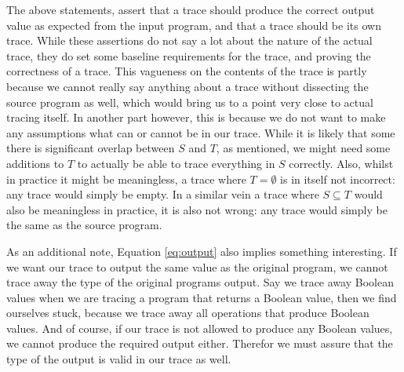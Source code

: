         The above statements, assert that a trace should produce the correct output value as expected from the input program, and that a trace should be its own trace.
        While these assertions do not say a lot about the nature of the actual trace, they do set some baseline requirements for the trace, and proving the correctness of a trace.
        This vagueness on the contents of the trace is partly because we cannot really say anything about a trace without dissecting the source program as well, which would bring us to a point very close to actual tracing itself.
        In another part however, this is because we do not want to make any assumptions what can or cannot be in our trace.
        While it is likely that some there is significant overlap between $S$ and $T$, as mentioned, we might need some additions to $T$ to actually be able to trace everything in $S$ correctly.
        Also, whilst in practice it might be meaningless, a trace where $T=\emptyset$ is in itself not incorrect: any trace would simply be empty.
        In a similar vein a trace where $S\subseteq T$ would also be meaningless in practice, it is also not wrong: any trace would simply be the same as the source program.

        As an additional note, Equation \ref{eq:output} also implies something interesting.
        If we want our trace to output the same value as the original program, we cannot trace away the type of the original programs output.
        Say we trace away Boolean values when we are tracing a program that returns a Boolean value, then we find ourselves stuck, because we trace away all operations that produce Boolean values.
        And of course, if our trace is not allowed to produce any Boolean values, we cannot produce the required output either.
        Therefor we must assure that the type of the output is valid in our trace as well.

